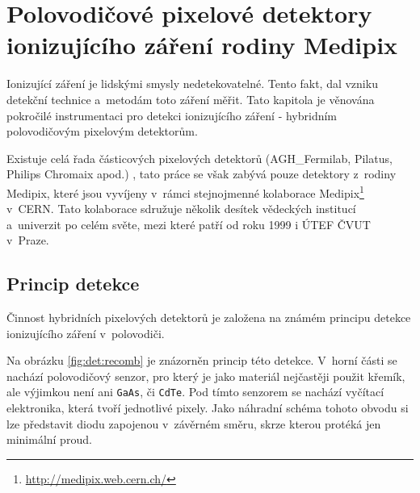 

\chapter{Polovodičové pixelové detektory ionizujícího záření rodiny Medipix}\label{det}
Ionizující záření je lidskými smysly nedetekovatelné. Tento fakt, dal vzniku detekční technice a~metodám toto záření měřit. Tato kapitola je věnována pokročilé instrumentaci pro detekci ionizujícího záření  - hybridním polovodičovým pixelovým detektorům.

Existuje celá řada částicových pixelových detektorů (AGH\_Fermilab, Pilatus, Philips Chromaix apod.) \cite{detectors_review}, tato práce se však zabývá pouze detektory z~rodiny Medipix, které jsou vyvíjeny v~rámci stejnojmenné kolaborace Medipix\footnote{\url{http://medipix.web.cern.ch/}} v~CERN. Tato kolaborace sdružuje několik desítek vědeckých institucí a~univerzit po celém světe, mezi které patří od roku 1999 i ÚTEF ČVUT v~Praze.


\clearpage

\section{Princip detekce}
Činnost hybridních pixelových detektorů je založena na známém principu detekce ionizujícího záření v~polovodiči. 

Na obrázku \ref{fig:det:recomb} je znázorněn princip této detekce. V~horní části se nachází polovodičový senzor, pro který je jako materiál nejčastěji použit křemík, ale výjimkou není ani \texttt{GaAs}, či \texttt{CdTe}. Pod tímto senzorem se nachází vyčítací elektronika, která tvoří jednotlivé pixely. Jako náhradní schéma tohoto obvodu si lze představit diodu zapojenou v~závěrném směru, skrze kterou protéká jen minimální proud. 

